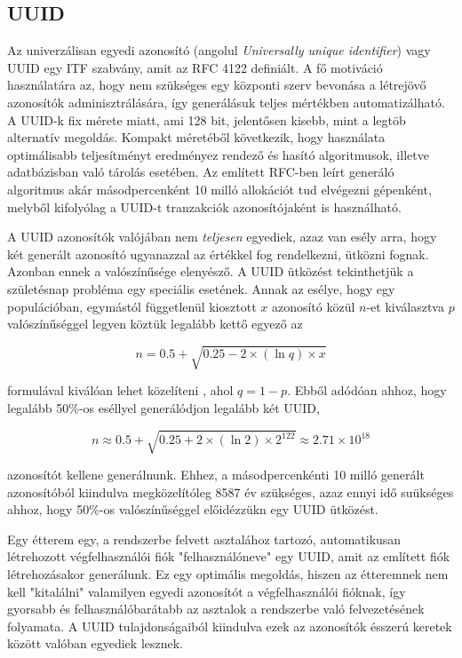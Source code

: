 \subsection{UUID}

Az univerzálisan egyedi azonosító (angolul \emph{Universally unique identifier}) vagy UUID egy ITF szabvány, amit az RFC 4122 definiált. A fő motiváció használatára az, hogy nem szükséges egy központi szerv bevonása a létrejövő azonosítók adminisztrálására, így generálásuk teljes mértékben automatizálható. A UUID-k fix mérete miatt, ami 128 bit, jelentősen kisebb, mint a legtöb alternatív megoldás. Kompakt méretéből következik, hogy használata optimálisabb teljesítményt eredményez rendező és hasító algoritmusok, illetve adatbázisban való tárolás esetében. Az említett RFC-ben leírt generáló algoritmus akár másodpercenként 10 milló allokációt tud elvégezni gépenként, melyből kifolyólag a UUID-t tranzakciók azonosítójaként is használható. \par

A UUID azonosítók valójában nem \emph{teljesen} egyediek, azaz van esély arra, hogy két generált azonosító ugyanazzal az értékkel fog rendelkezni, ütközni fognak. Azonban ennek a valószínűsége elenyésző. A UUID ütközést tekinthetjük a születésnap probléma egy speciális esetének. Annak az esélye, hogy egy populációban, egymástól függetlenül kiosztott $x$ azonosító közül $n$-et kiválasztva $p$ valószínűséggel legyen köztük legalább kettő egyező az

\begin{equation*}
	n = 0.5 + \sqrt{0.25 - 2\times(\ln q)\times x}
\end{equation*}

formulával kiválóan lehet közelíteni \cite{mathis1991generalized}, ahol $q = 1 - p$. Ebből adódóan ahhoz, hogy legalább 50\%-os eséllyel generálódjon legalább két UUID,

\begin{equation*}
	n \approx 0.5 + \sqrt{0.25 + 2\times(\ln 2)\times2^{122}} \approx 2.71 \times 10^{18}
\end{equation*}

azonosítót kellene generálnunk. Ehhez, a másodpercenkénti 10 milló generált azonosítóból kiindulva megközelítóleg 8587 év szükséges, azaz ennyi idő suükséges ahhoz, hogy 50\%-os valószínűséggel előidézzükn egy UUID ütközést. \par

Egy étterem egy, a rendszerbe felvett asztalához tartozó, automatikusan létrehozott végfelhasználói fiók "felhasználóneve" egy UUID, amit az említett fiók létrehozásakor generálunk. Ez egy optimális megoldás, hiszen az étteremnek nem kell "kitalálni" valamilyen egyedi azonosítót a végfelhasználói fióknak, így gyorsabb és felhasználóbarátabb az asztalok a rendszerbe való felvezetésének folyamata. A UUID tulajdonságaiból kiindulva ezek az azonosítók ésszerú keretek között valóban egyediek lesznek.